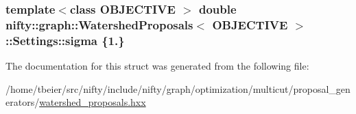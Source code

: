 \subsubsection[{sigma}]{\setlength{\rightskip}{0pt plus 5cm}template$<$class O\+B\+J\+E\+C\+T\+I\+V\+E $>$ double {\bf nifty\+::graph\+::\+Watershed\+Proposals}$<$ O\+B\+J\+E\+C\+T\+I\+V\+E $>$\+::Settings\+::sigma \{1.\}}\label{structnifty_1_1graph_1_1WatershedProposals_1_1Settings_a604962a694ab8983b5a4aa914bf1c7eb}


The documentation for this struct was generated from the following file\+:\begin{DoxyCompactItemize}
\item 
/home/tbeier/src/nifty/include/nifty/graph/optimization/multicut/proposal\+\_\+generators/\hyperlink{watershed__proposals_8hxx}{watershed\+\_\+proposals.\+hxx}\end{DoxyCompactItemize}
